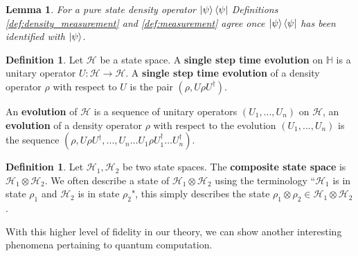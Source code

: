 \documentclass[12pt]{article}
\theoremstyle{plain}
\newtheorem{lemma}[thm]{Lemma}
\theoremstyle{definition}
\newtheorem{defn}[thm]{Definition} %
\newcommand{\bb}[1]{\mathbb{#1}}
\newcommand{\call}[1]{\mathcal{#1}}
\newcommand{\lto}{\longrightarrow}
\begin{document}
	\begin{lemma}
		For a pure state density operator $\ket{\psi}\bra{\psi}$ Definitions \ref{def:density_measurement} and \ref{def:measurement} agree once $\ket{\psi}\bra{\psi}$ has been identified with $\ket{\psi}$.
	\end{lemma}
	
	\begin{defn}
		Let $\call{H}$ be a state space. A \textbf{single step time evolution} on $\bb{H}$ is a unitary operator $U: \call{H} \lto \call{H}$. A \textbf{single step time evolution} of a density operator $\rho$ with respect to $U$ is the pair $(\rho, U\rho U^\dagger)$.
		
		An \textbf{evolution} of $\call{H}$ is a sequence of unitary operators $(U_1,...,U_n)$ on $\call{H}$, an \textbf{evolution} of a density operator $\rho$ with respect to the evolution $(U_1,...,U_n)$ is the sequence $(\rho, U\rho U^\dagger, ..., U_n\hdots U_1 \rho U_1^\dagger \hdots U_n^\dagger)$.
	\end{defn}
	
	\begin{defn}
		Let $\call{H}_1,\call{H}_2$ be two state spaces. The \textbf{composite state space }is $\call{H}_1 \otimes \call{H}_2$. We often describe a state of $\call{H}_1 \otimes \call{H}_2$ using the terminology ``$\call{H}_1$ is in state $\rho_1$ and $\call{H}_2$ is in state $\rho_2$",  this simply describes the state $\rho_1 \otimes \rho_2 \in \call{H}_1 \otimes \call{H}_2$.
	\end{defn}
	
	With this higher level of fidelity in our theory, we can show another interesting phenomena pertaining to quantum computation.
	
\end{document}
